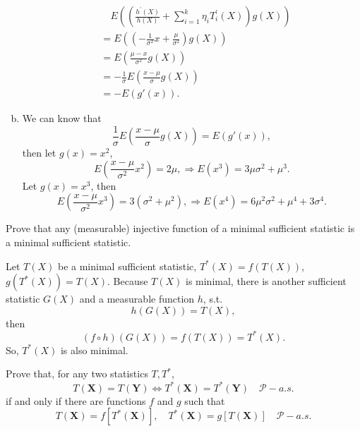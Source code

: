 \begin{solution}
\begin{enumerate}[(a)]
        \[
            \begin{aligned}
                &\quad E\left(\left(\frac{h^{\prime}(X)}{h(X)}+\sum_{i=1}^{k} \eta_{i} T_{i}^{\prime}(X)\right) g(X)\right)\\
                &=E\left(\left(-\frac{1}{\sigma^2}x+\frac{\mu}{\sigma^2}\right) g(X)\right)\\
                &=E\left(\frac{\mu-x}{\sigma^2} g(X)\right)\\
                &=-\frac{1}{\sigma} E\left(\frac{x-\mu}{\sigma} g(X)\right)\\
                &=-E(g'(x)). 
            \end{aligned}
        \]
        \item We can know that \[
            \frac{1}{\sigma} E\left(\frac{x-\mu}{\sigma} g(X)\right)=E(g'(x)), 
        \]
        then let $g(x)=x^2$, 
        \[
            E\left(\frac{x-\mu}{\sigma^2}x^2\right)=2\mu, \Rightarrow E(x^3)=3\mu\sigma^2+\mu^3. 
        \]
        Let $g(x)=x^3$, then
        \[
            E\left(\frac{x-\mu}{\sigma^2}x^3\right)=3(\sigma^2+\mu^2), \Rightarrow E(x^4)=6\mu^2\sigma^2+\mu^4+3\sigma^4. 
        \]
    \end{enumerate}
\end{solution}

\begin{exercise}
    Prove that any (measurable) injective function of a minimal sufficient statistic is a minimal sufficient statistic. 
\end{exercise}

\begin{solution}
    Let $T(X)$ be a minimal sufficient statistic, $T^*(X)=f(T(X))$, $g(T^*(X))=T(X)$. Because $T(X)$ is minimal, there is another sufficient statistic $G(X)$ and a measurable function $h$, s.t. 
    \[
        h(G(X))=T(X), 
    \]
    then
    \[
        (f\circ h)(G(X))=f(T(X))=T^*(X). 
    \]
    So, $T^*(X)$ is also minimal. 
\end{solution}

\begin{exercise}
    Prove that, for any two statistics \(T, T^{*}\),
    \[
    T(\mathbf{X})=T(\mathbf{Y}) \Leftrightarrow T^{*}(\mathbf{X})=T^{*}(\mathbf{Y}) \quad \mathcal{P}-a.s.
    \]
    if and only if there are functions \(f\) and \(g\) such that
    \[
    T(\mathbf{X})=f\left[T^{*}(\mathbf{X})\right], \quad T^{*}(\mathbf{X})=g[T(\mathbf{X})] \quad \mathcal{P}-a.s.
    \]
\end{exercise}


